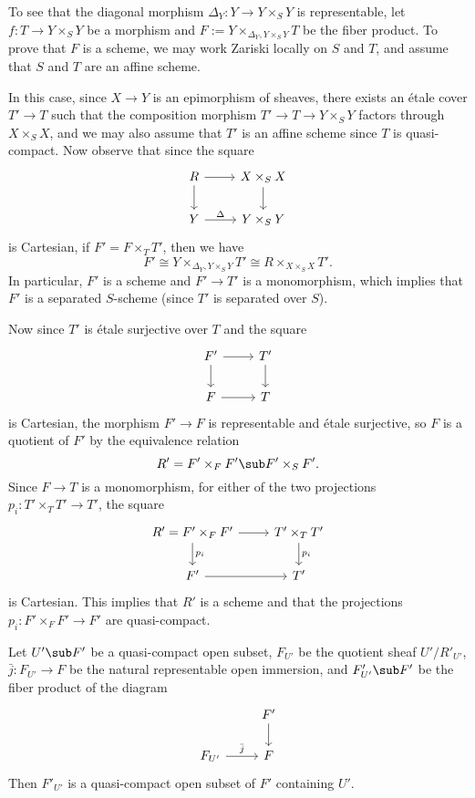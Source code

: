 To see that the diagonal morphism $\Delta_Y:Y\to Y\times_SY$ is representable, let $f:T\to Y\times_SY$ be a morphism and $F:=Y\times_{\Delta_Y,Y\times_SY}T$ be the fiber product. To prove that $F$ is a scheme, we may work Zariski locally on $S$ and $T$, and assume that $S$ and $T$ are an affine scheme.\par
In this case, since $X\to Y$ is an epimorphism of sheaves, there exists an \'etale cover $T'\to T$ such that the composition morphism $T'\to T\to Y\times_SY$ factors through $X\times_SX$, and we may also assume that $T'$ is an affine scheme since $T$ is quasi-compact. Now observe that since the square 
\[\begin{tikzcd}
R\ar[r]\ar[d]&X\times_SX\ar[d]\\
Y\ar[r,"\Delta"]&Y\times_SY
\end{tikzcd}\]
is Cartesian, if $F'=F\times_TT'$, then we have
\[F'\cong Y\times_{\Delta_Y,Y\times_SY}T'\cong R\times_{X\times_SX}T'.\]
In particular, $F'$ is a scheme and $F'\to T'$ is a monomorphism, which implies that $F'$ is a separated $S$-scheme (since $T'$ is separated over $S$).\par
Now since $T'$ is \'etale surjective over $T$ and the square
\[\begin{tikzcd}
F'\ar[r]\ar[d]&T'\ar[d]\\
F\ar[r]&T
\end{tikzcd}\]
is Cartesian, the morphism $F'\to F$ is representable and \'etale surjective, so $F$ is a quotient of $F'$ by the equivalence relation
\[R'=F'\times_FF'\sub F'\times_SF'.\]
Since $F\to T$ is a monomorphism, for either of the two projections $p_i:T'\times_TT'\to T'$, the square
\[\begin{tikzcd}
R'=F'\times_FF'\ar[d,"p_i"]\ar[r]&T'\times_TT'\ar[d,"p_i"]\\
F'\ar[r]&T'
\end{tikzcd}\]
is Cartesian. This implies that $R'$ is a scheme and that the projections $p_i:F'\times_FF'\to F'$ are quasi-compact.
\begin{lemma}
Let $U'\sub F'$ be a quasi-compact open subset, $F_{U'}$ be the quotient sheaf $U'/R'_{U'}$, $\bar{j}:F_{U'}\to F$ be the natural representable open immersion, and $F'_{U'}\sub F'$ be the fiber product of the diagram
\[\begin{tikzcd}
&F'\ar[d]\\
F_{U'}\ar[r,"\bar{j}"]&F
\end{tikzcd}\]
Then $F'_{U'}$ is a quasi-compact open subset of $F'$ containing $U'$.
\end{lemma}
